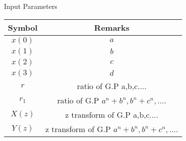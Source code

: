 \setlength{\arrayrulewidth}{0.3mm}
\setlength{\tabcolsep}{12pt}
\renewcommand{\arraystretch}{1.5}


\begin{center}
\caption{Input Parameters}
\begin{tabular}{|c|c|}

\hline
 {Symbol}&{Remarks}\\
\hline
$x(0) $ & $a$ \\
\hline
$x(1) $ & $b$ \\
\hline
$x(2) $ & $c$ \\
\hline
$x(3) $ & $d$ \\
\hline
$r$ & ratio of G.P a,b,c....\\
\hline
$r_1$ & ratio of G.P $a^n + b^n,b^n + c^n,....$\\
\hline
$X(z)$ & z transform of G.P a,b,c....\\
\hline
$Y(z)$ & z transform of G.P $a^n + b^n,b^n + c^n,....$\\
\hline

\end{tabular}
\label{Table:11.9.5.17.3}
\end{center}
